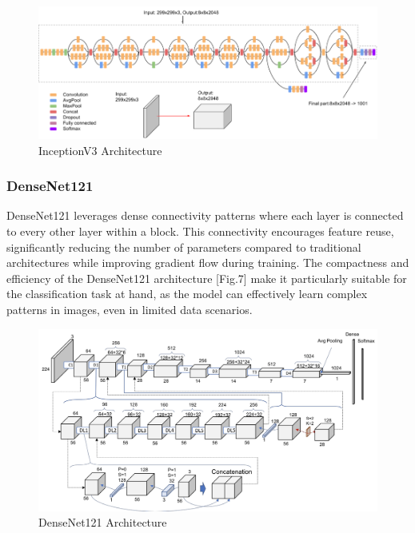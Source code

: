 \begin{figure}[h!]
    \centering
    \includegraphics[width=\linewidth]{Images/InceptionV3}
    \caption{InceptionV3 Architecture}
\end{figure}

\subsubsection*{DenseNet121}
DenseNet121 leverages dense connectivity patterns where each layer is connected to every other layer within a block.
This connectivity encourages feature reuse, significantly reducing the number of parameters compared to traditional
architectures while improving gradient flow during training. The compactness and efficiency of the DenseNet121
architecture [Fig.7] make it particularly suitable for the classification task at hand, as the model can effectively learn
complex patterns in images, even in limited data scenarios.

\begin{figure}[h!]
    \centering
    \includegraphics[width=\linewidth]{Images/Densenet121}
    \caption{DenseNet121 Architecture}
\end{figure}

\vspace{0.3cm}

